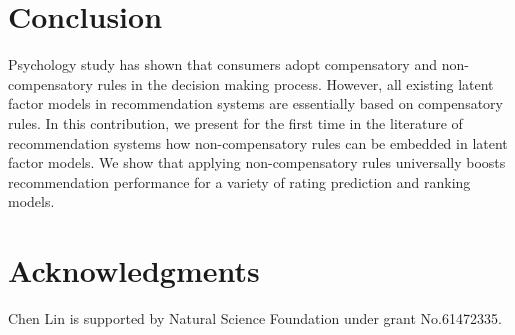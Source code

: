 \documentclass[letterpaper]{article} %
\begin{document}
\section{Conclusion}\label{sec:conclusion}
Psychology study has shown that consumers adopt compensatory and non-compensatory rules in the decision making process. However, all existing latent factor models in recommendation systems are essentially based on compensatory rules. In this contribution, we present for the first time in the literature of recommendation systems how non-compensatory rules can be embedded in latent factor models. We show that applying non-compensatory rules universally boosts recommendation performance for a variety of rating prediction and ranking models. 

\section{ Acknowledgments}
Chen Lin is supported by Natural Science Foundation under grant No.61472335. 


\end{document}
